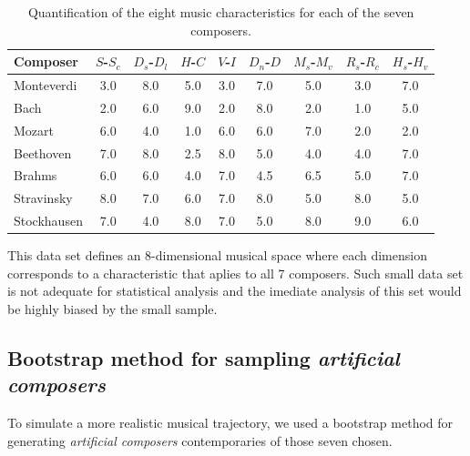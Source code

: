 \documentclass[
 aip,
 jmp,
 amsmath,amssymb,
 reprint,
]{revtex4-1}
\begin{document}
\begin{table}[ht]
\caption{\label{tab:tableA}Quantification of the
eight music characteristics for each of the seven composers.}

\begin{ruledtabular}
\begin{tabular}{|l|c|c|c|c|c|c|c|c|}

Composer    & $S$-$S_c$ & $D_s$-$D_l$ & $H$-$C$ & $V$-$I$ & $D_n$-$D$ & $M_s$-$M_v$ & $R_s$-$R_c$ & $H_s$-$H_v$  \\
\hline
 Monteverdi   & 3.0 & 8.0 & 5.0 & 3.0 & 7.0 & 5.0 & 3.0 & 7.0  \\
 Bach         & 2.0 & 6.0 & 9.0 & 2.0 & 8.0 & 2.0 & 1.0 & 5.0  \\
 Mozart       & 6.0 & 4.0 & 1.0 & 6.0 & 6.0 & 7.0 & 2.0 & 2.0  \\
 Beethoven    & 7.0 & 8.0 & 2.5 & 8.0 & 5.0 & 4.0 & 4.0 & 7.0  \\
 Brahms       & 6.0 & 6.0 & 4.0 & 7.0 & 4.5 & 6.5 & 5.0 & 7.0  \\
 Stravinsky   & 8.0 & 7.0 & 6.0 & 7.0 & 8.0 & 5.0 & 8.0 & 5.0  \\
 Stockhausen  & 7.0 & 4.0 & 8.0 & 7.0 & 5.0 & 8.0 & 9.0 & 6.0  \\

\end{tabular}
\end{ruledtabular}
\end{table}

This data set defines an 8-dimensional musical space where each dimension
corresponds to a characteristic that aplies to all 7 composers. 
Such small data set is not adequate for statistical analysis and the imediate analysis of this set would
be highly biased by the small sample.

\subsection{Bootstrap method for sampling \emph{artificial composers}}

To simulate a more realistic musical trajectory, we used a bootstrap
method for generating \emph{artificial composers} contemporaries of those seven chosen.
\end{document}
